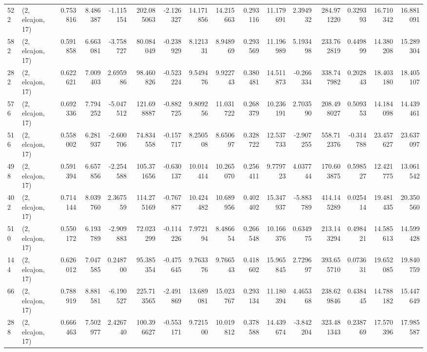 \begin{tabular}{llrrrrrrrrrrrrrr}
522 &  (2, elcajon, 17) &   0.753816 &   8.486387 &  -1.115154 &   202.085063 &  -2.126327 &  14.171856 &  14.215663 &  0.293116 &  11.179691 &   2.394932 &   284.971220 &  0.329393 &  16.710342 &  16.881091 \\
582 &  (2, elcajon, 17) &   0.591858 &   6.663081 &  -3.758727 &    80.084049 &  -0.238929 &   8.121331 &   8.948969 &  0.293569 &  11.196989 &   5.193498 &   233.762819 &  0.449899 &  14.380208 &  15.289304 \\
282 &  (2, elcajon, 17) &   0.622621 &   7.009403 &   2.695986 &    98.460826 &  -0.523224 &   9.549476 &   9.922743 &  0.380481 &  14.511873 &  -0.266334 &   338.747982 &  0.202843 &  18.403180 &  18.405107 \\
576 &  (2, elcajon, 17) &   0.692336 &   7.794252 &  -5.047512 &   121.698887 &  -0.882725 &   9.809256 &  11.031722 &  0.268379 &  10.236191 &   2.703590 &   208.498027 &  0.509353 &  14.184098 &  14.439461 \\
516 &  (2, elcajon, 17) &   0.558002 &   6.281937 &  -2.600706 &    74.834558 &  -0.157717 &   8.250508 &   8.650697 &  0.328722 &  12.537733 &  -2.907255 &   558.712376 & -0.314788 &  23.457627 &  23.637097 \\
498 &  (2, elcajon, 17) &   0.591394 &   6.657856 &  -2.254588 &   105.371656 &  -0.630137 &  10.014414 &  10.265070 &  0.256411 &   9.779723 &   4.037744 &   170.603875 &  0.598527 &  12.421775 &  13.061542 \\
402 &  (2, elcajon, 17) &   0.714144 &   8.039760 &   2.367559 &   114.275169 &  -0.767877 &  10.424482 &  10.689956 &  0.402402 &  15.347937 &  -5.883789 &   414.145289 &  0.025414 &  19.481435 &  20.350560 \\
510 &  (2, elcajon, 17) &   0.550172 &   6.193789 &  -2.909883 &    72.023299 &  -0.114226 &   7.972194 &   8.486654 &  0.266548 &  10.166376 &   0.634975 &   213.143294 &  0.498421 &  14.585613 &  14.599428 \\
144 &  (2, elcajon, 17) &   0.626012 &   7.047585 &   0.248700 &    95.385354 &  -0.475645 &   9.763376 &   9.766543 &  0.418602 &  15.965845 &   2.729697 &   393.655710 &  0.073631 &  19.652085 &  19.840759 \\
66  &  (2, elcajon, 17) &   0.788919 &   8.881581 &  -6.190527 &   225.713565 &  -2.491869 &  13.689081 &  15.023767 &  0.293134 &  11.180394 &   4.465368 &   238.629846 &  0.438445 &  14.788182 &  15.447649 \\
288 &  (2, elcajon, 17) &   0.666463 &   7.502977 &   2.426740 &   100.396627 &  -0.553171 &   9.721500 &  10.019812 &  0.378588 &  14.439674 &  -3.842204 &   323.481343 &  0.238769 &  17.570396 &  17.985587 \\

\end{tabular}
